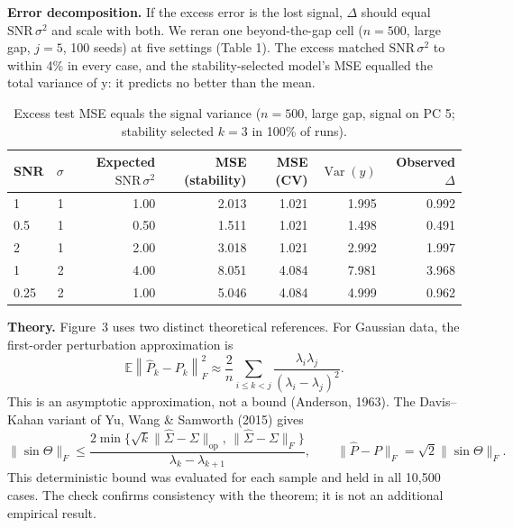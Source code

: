 \documentclass[11pt]{article}
\begin{document}
\textbf{Error decomposition.} If the excess error is the lost signal, $\Delta$ should equal $\mathrm{SNR}\,\sigma^2$ and scale with both. We reran one beyond-the-gap cell ($n=500$, large gap, $j=5$, 100 seeds) at five settings (Table 1). The excess matched $\mathrm{SNR}\,\sigma^2$ to within 4\% in every case, and the stability-selected model's MSE equalled the total variance of y: it predicts no better than the mean.\par

\begin{table}[!htbp]
\centering
\caption{Excess test MSE equals the signal variance ($n=500$, large gap, signal on PC 5; stability selected $k=3$ in 100\% of runs).}
\scriptsize
\setlength{\tabcolsep}{3.2pt}
\begin{tabular}{@{}lrrrrrr@{}}
\toprule
SNR & $\sigma$ & Expected $\mathrm{SNR}\,\sigma^2$ & MSE (stability) & MSE (CV) & $\operatorname{Var}(y)$ & Observed $\Delta$ \\
\midrule
1 & 1 & 1.00 & 2.013 & 1.021 & 1.995 & 0.992 \\
0.5 & 1 & 0.50 & 1.511 & 1.021 & 1.498 & 0.491 \\
2 & 1 & 2.00 & 3.018 & 1.021 & 2.992 & 1.997 \\
1 & 2 & 4.00 & 8.051 & 4.084 & 7.981 & 3.968 \\
0.25 & 2 & 1.00 & 5.046 & 4.084 & 4.999 & 0.962 \\
\bottomrule
\end{tabular}
\end{table}

\textbf{Theory.} Figure~3 uses two distinct theoretical references. For Gaussian data, the first-order perturbation approximation is
\begin{equation}
\mathbb E\left\lVert\widehat P_k-P_k\right\rVert_F^2\approx \frac{2}{n}\sum_{i\leq k<j}\frac{\lambda_i\lambda_j}{(\lambda_i-\lambda_j)^2}.
\end{equation}
This is an asymptotic approximation, not a bound (Anderson, 1963). The Davis--Kahan variant of Yu, Wang \& Samworth (2015) gives
\begin{equation}
\lVert\sin\Theta\rVert_F \leq \frac{2\min\{\sqrt{k}\lVert\widehat\Sigma-\Sigma\rVert_{\mathrm{op}},\,\lVert\widehat\Sigma-\Sigma\rVert_F\}}{\lambda_k-\lambda_{k+1}},\qquad\lVert\widehat P-P\rVert_F=\sqrt{2}\lVert\sin\Theta\rVert_F.
\end{equation}
This deterministic bound was evaluated for each sample and held in all 10,500 cases. The check confirms consistency with the theorem; it is not an additional empirical result.
\end{document}
